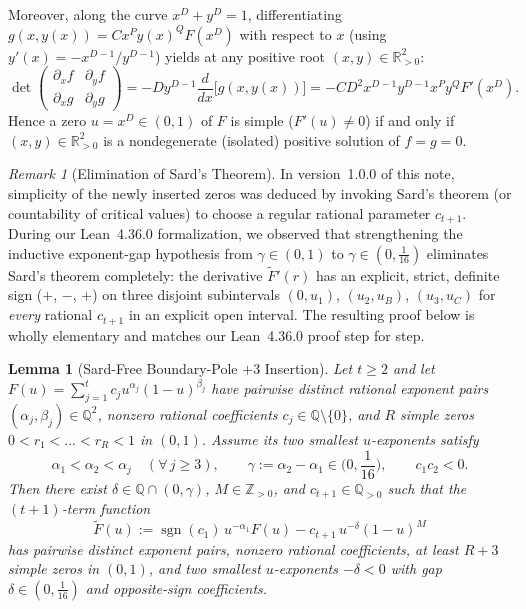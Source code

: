 \documentclass[11pt,a4paper]{amsart}
\newtheorem{lemma}[theorem]{Lemma}
\theoremstyle{remark}
\newtheorem{remark}[theorem]{Remark}
\newcommand{\R}{\mathbb{R}}
\newcommand{\Q}{\mathbb{Q}}
\newcommand{\Z}{\mathbb{Z}}
\begin{document}
Moreover, along the curve $x^D + y^D = 1$, differentiating $g(x, y(x)) = C x^P y(x)^Q F(x^D)$ with respect to $x$ (using $y'(x) = -x^{D-1}/y^{D-1}$) yields at any positive root $(x, y) \in \R_{>0}^2$:
\begin{equation}\label{eq:jac}
  \det \begin{pmatrix} \partial_x f & \partial_y f \\ \partial_x g & \partial_y g \end{pmatrix}
  = -D y^{D-1} \frac{d}{dx}\big[g(x, y(x))\big]
  = -C D^2 x^{D-1} y^{D-1} x^P y^Q F'(x^D).
\end{equation}
Hence a zero $u = x^D \in (0, 1)$ of $F$ is simple ($F'(u) \neq 0$) if and only if $(x, y) \in \R_{>0}^2$ is a nondegenerate (isolated) positive solution of $f = g = 0$.

\begin{remark}[Elimination of Sard's Theorem]
In version~1.0.0 of this note, simplicity of the newly inserted zeros was deduced by invoking Sard's theorem (or countability of critical values) to choose a regular rational parameter $c_{t+1}$. During our Lean~4.36.0 formalization, we observed that strengthening the inductive exponent-gap hypothesis from $\gamma \in (0, 1)$ to $\gamma \in (0, \tfrac{1}{16})$ eliminates Sard's theorem completely: the derivative $\widetilde{F}'(r)$ has an explicit, strict, definite sign ($+$, $-$, $+$) on three disjoint subintervals $(0, u_1)$, $(u_2, u_B)$, $(u_3, u_C)$ for \emph{every} rational $c_{t+1}$ in an explicit open interval. The resulting proof below is wholly elementary and matches our Lean~4.36.0 proof step for step.
\end{remark}

\begin{lemma}[Sard-Free Boundary-Pole $+3$ Insertion]\label{lem:insert}
Let $t \ge 2$ and let $F(u) = \sum_{j=1}^t c_j u^{\alpha_j}(1-u)^{\beta_j}$ have pairwise distinct rational exponent pairs $(\alpha_j, \beta_j) \in \Q^2$, nonzero rational coefficients $c_j \in \Q \setminus \{0\}$, and $R$ simple zeros $0 < r_1 < \dots < r_R < 1$ in $(0, 1)$. Assume its two smallest $u$-exponents satisfy
\[
  \alpha_1 < \alpha_2 < \alpha_j \quad (\forall\, j \ge 3), \qquad \gamma := \alpha_2 - \alpha_1 \in \Big(0, \frac{1}{16}\Big), \qquad c_1 c_2 < 0.
\]
Then there exist $\delta \in \Q \cap (0, \gamma)$, $M \in \Z_{>0}$, and $c_{t+1} \in \Q_{>0}$ such that the $(t+1)$-term function
\[
  \widetilde{F}(u) := \operatorname{sgn}(c_1)\, u^{-\alpha_1} F(u) - c_{t+1}\, u^{-\delta}(1-u)^M
\]
has pairwise distinct exponent pairs, nonzero rational coefficients, at least $R + 3$ simple zeros in $(0, 1)$, and two smallest $u$-exponents $-\delta < 0$ with gap $\delta \in (0, \tfrac{1}{16})$ and opposite-sign coefficients.
\end{lemma}
\end{document}
